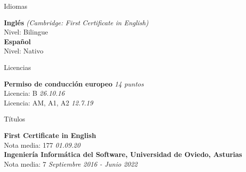 \documentclass{resume} %
\begin{document}

\begin{rSection}{Idiomas}

{\bf Inglés} \hfill {\em (Cambridge: First Certificate in English)}\\
Nivel: Bilingue \\

{\bf Español} \\
Nivel: Nativo \\


\end{rSection}


\begin{rSection}{Licencias}

{\bf Permiso de conducción europeo} \hfill {\em 14 puntos}\\ 
Licencia: B \hfill {\em 26.10.16} \\
Licencia: AM, A1, A2 \hfill {\em 12.7.19} \\

\end{rSection}


\begin{rSection}{Títulos}

{\bf First Certificate in English} \\ 
Nota media: 177 \hfill {\em 01.09.20} \\

{\bf Ingeniería Informática del Software, Universidad de Oviedo, Asturias} \\
Nota media: 7 \hfill {\em Septiembre 2016 - Junio 2022} \\ 


\end{rSection}

\end{document}
